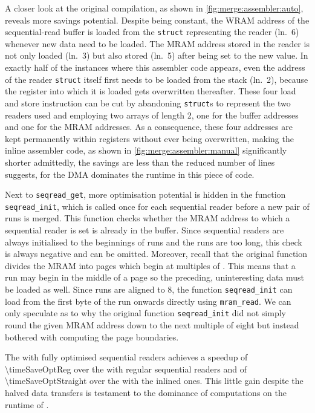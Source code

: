 A closer look at the original compilation, as shown in \cref{fig:merge:assembler:auto}, reveals more savings potential.
Despite being constant, the \ac{WRAM} address of the sequential-read buffer is loaded from the \lstinline[keywords={}]|struct| representing the reader (ln.~6) whenever new data need to be loaded.
The \ac{MRAM} address stored in the reader is not only loaded (ln.~3) but also stored (ln.~5) after being set to the new value.
In exactly half of the instances where this assembler code appears, even the address of the reader \lstinline[keywords={}]|struct| itself first needs to be loaded from the stack (ln.~2), because the register into which it is loaded gets overwritten thereafter.
These four load and store instruction can be cut by abandoning \lstinline[keywords={}]|struct|s to represent the two readers used and employing two arrays of length 2, one for the buffer addresses and one for the \ac{MRAM} addresses.
As a consequence, these four addresses are kept permanently within registers without ever being overwritten, making the inline assembler code, as shown in \cref{fig:merge:assembler:manual} significantly shorter \Dash admittedly, the savings are less than the reduced number of lines suggests, for the \ac{DMA} dominates the runtime in this piece of code.

Next to \lstinline|seqread_get|, more optimisation potential is hidden in the function \lstinline|seqread_init|, which is called once for each sequential reader before a new pair of runs is merged.
This function checks whether the \ac{MRAM} address to which a sequential reader is set is already in the buffer.
Since sequential readers are always initialised to the beginnings of runs and the runs are too long, this check is always negative and can be omitted.
Moreover, recall that the original function divides the \ac{MRAM} into pages which begin at multiples of \seqreadcachesize{}.
This means that a run may begin in the middle of a page so the preceding, uninteresting data must be loaded as well.
Since runs are aligned to \qty{8}{\byte}, the function \lstinline|seqread_init| can load from the first byte of the run onwards directly using \lstinline|mram_read|.
We can only speculate as to why the original function \lstinline|seqread_init| did not simply round the given \ac{MRAM} address down to the next multiple of eight but instead bothered with computing the page boundaries.

The \MS{} with fully optimised sequential readers achieves a speedup of \num[round-mode=places, round-precision=2]{\timeSaveOptReg} over the \MS{} with regular sequential readers and of \num[round-mode=places, round-precision=2]{\timeSaveOptStraight} over the \MS{} with the inlined ones.
This little gain despite the halved data transfers is testament to the dominance of computations on the runtime of \MS{}.

